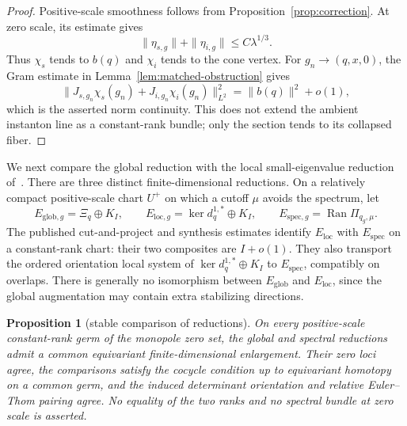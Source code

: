 \documentclass[11pt]{amsart}
\newtheorem{proposition}[theorem]{Proposition}
\theoremstyle{definition}
\theoremstyle{remark}
\theoremstyle{plain}
\begin{document}
\begin{proof}
Positive-scale smoothness follows from Proposition~\ref{prop:correction}.
At zero scale, its estimate gives
\[
 \|\eta_{s,g}\|+\|\eta_{i,g}\|\leq C\lambda^{1/3}.
\]
Thus $\chi_s$ tends to $b(q)$ and $\chi_i$ tends to the cone vertex.  For
$g_n\to(q,x,0)$, the Gram estimate in
Lemma~\ref{lem:matched-obstruction} gives
\[
 \|J_{s,g_n}\chi_s(g_n)+J_{i,g_n}\chi_i(g_n)\|_{L^2}^2
 =\|b(q)\|^2+o(1),
\]
which is the asserted norm continuity.  This does not extend the ambient
instanton line as a constant-rank bundle; only the section tends to its
collapsed fiber.
\end{proof}

We next compare the global reduction with the local small-eigenvalue
reduction of~\cite[Section~8]{FeehanLenessIII}.  There are three distinct
finite-dimensional reductions.  On a relatively compact positive-scale
chart $U^+$ on which a
cutoff $\mu$ avoids the spectrum, let
\begin{equation}\label{eq:three-obstruction-models}
 E_{\mathrm{glob},g}=\Xi_q\oplus K_I,\qquad
 E_{\mathrm{loc},g}=\ker d_q^{1,*}\oplus K_I,\qquad
 E_{\mathrm{spec},g}=\operatorname{Ran}\Pi_{q_g,\mu}.
\end{equation}
The published cut-and-project and synthesis estimates
\cite[Propositions~8.19 and~8.26]{FeehanLenessIII} identify
$E_{\mathrm{loc}}$ with $E_{\mathrm{spec}}$ on a constant-rank chart:
their two composites are $I+o(1)$.  They also transport the ordered
orientation local system of
$\ker d_q^{1,*}\oplus K_I$ to $E_{\mathrm{spec}}$, compatibly on overlaps.
There is generally no isomorphism between $E_{\mathrm{glob}}$ and
$E_{\mathrm{loc}}$, since the global augmentation may contain extra
stabilizing directions.

\begin{proposition}[stable comparison of reductions]
\label{prop:stable-reduction}
On every positive-scale constant-rank germ of the monopole zero set, the
global and spectral reductions admit a common equivariant finite-dimensional
enlargement.  Their zero loci agree, the comparisons satisfy the cocycle
condition up to equivariant homotopy on a common germ, and the induced determinant
orientation and relative Euler--Thom pairing agree.  No equality of the two
ranks and no spectral bundle at zero scale is asserted.
\end{proposition}
\end{document}
